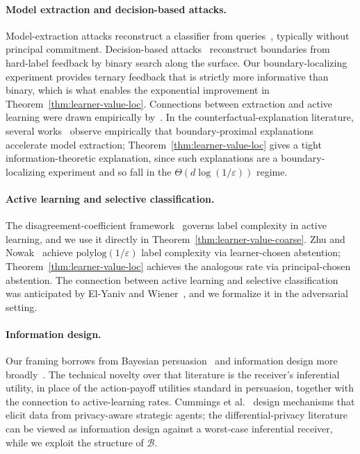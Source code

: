 \documentclass[runningheads,envcountsame]{llncs}
\newcommand{\cB}{\mathcal{B}}
\newcommand{\eps}{\varepsilon}
\begin{document}
\paragraph{Model extraction and decision-based attacks.}
Model-extraction attacks reconstruct a classifier from queries~\cite{lowd2005adversarial,tramer2016stealing,jagielski2020extraction}, typically without principal commitment. Decision-based attacks~\cite{brendel2018decision,chen2020hopskipjump} reconstruct boundaries from hard-label feedback by binary search along the surface. Our boundary-localizing experiment provides ternary feedback that is strictly more informative than binary, which is what enables the exponential improvement in Theorem~\ref{thm:learner-value-loc}. Connections between extraction and active learning were drawn empirically by~\cite{chandrasekaran2020exploring,pal2020activethief}. In the counterfactual-explanation literature, several works~\cite{aivodji2020counterfactual,dissanayake2024polytope,wang2022dualcf} observe empirically that boundary-proximal explanations accelerate model extraction; Theorem~\ref{thm:learner-value-loc} gives a tight information-theoretic explanation, since such explanations are a boundary-localizing experiment and so fall in the $\Theta(d \log(1/\eps))$ regime.

\paragraph{Active learning and selective classification.}
The disagreement-coefficient framework~\cite{balcan2006agnostic,hanneke2014theory,wang2011smoothness,zhang2014beyond} governs label complexity in active learning, and we use it directly in Theorem~\ref{thm:learner-value-coarse}. Zhu and Nowak~\cite{zhu2022efficient} achieve $\mathrm{polylog}(1/\eps)$ label complexity via learner-chosen abstention; Theorem~\ref{thm:learner-value-loc} achieves the analogous rate via principal-chosen abstention. The connection between active learning and selective classification was anticipated by El-Yaniv and Wiener~\cite{elyaniv2010selective}, and we formalize it in the adversarial setting.

\paragraph{Information design.}
{\sloppy Our framing borrows from Bayesian persuasion~\cite{kamenica2011bayesian} and information design more broadly~\cite{bergemann2019information}. The technical novelty over that literature is the receiver's inferential utility, in place of the action-payoff utilities standard in persuasion, together with the connection to active-learning rates. Cummings et al.~\cite{cummings2015privacy} design mechanisms that elicit data from privacy-aware strategic agents; the differential-privacy literature can be viewed as information design against a worst-case inferential receiver, while we exploit the structure of $\cB$.\par}
\end{document}
